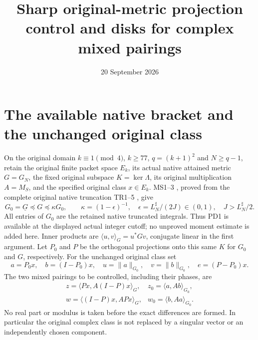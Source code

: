 \documentclass[11pt]{article}
\title{Sharp original-metric projection control and disks for complex mixed pairings}
\author{}
\date{20 September 2026}
\begin{document}
\maketitle

\section{The available native bracket and the unchanged original class}
On the original domain $k\equiv1\pmod4$, $k\ge77$, $q=(k+1)^2$
and $N\ge q-1$, retain the original finite packet space $E_k$, its actual native attained
metric $G=G_N$, the fixed original subspace $K=\ker\Lambda$, its original
multiplication $A=M_S$, and the specified original class $x\in E_k$.
MS1--3 \cite{MS}, proved from the complete original native truncation
TR1--5 \cite{TR}, give
\[
 G_0=\underline G\preceq G\preceq\kappa G_0,\qquad
 \kappa=(1-\epsilon)^{-1},\quad
 \epsilon=L_N^\sharp/(2J)\in(0,1),\quad J>L_N^\sharp/2.          \tag{PD1}
\]
All entries of $G_0$ are the retained native truncated integrals.
Thus PD1 is available at the displayed actual integer cutoff; no
unproved moment estimate is added here.  Inner products are
$\langle u,v\rangle_G=u^*Gv$, conjugate linear in the first argument.
Let $P_0$ and $P$ be the orthogonal projections onto this same $K$
for $G_0$ and $G$, respectively.  For the unchanged original class set
\[
 a=P_0x,\quad b=(I-P_0)x,\quad
 u=\|a\|_{G_0},\quad v=\|b\|_{G_0},\quad
 e=(P-P_0)x.
                                                                    \tag{PD2}
\]
The two mixed pairings to be controlled, including their phases, are
\[
 \begin{array}{ll}
 z=\langle Px,A(I-P)x\rangle_G,
   &z_0=\langle a,Ab\rangle_{G_0},\\
 w=\langle(I-P)x,APx\rangle_G,
   &w_0=\langle b,Aa\rangle_{G_0}.
 \end{array}                                                       \tag{PD3}
\]
No real part or modulus is taken before the exact differences are
formed.  In particular the original complex class is not replaced
by a singular vector or an independently chosen component.
\end{document}
